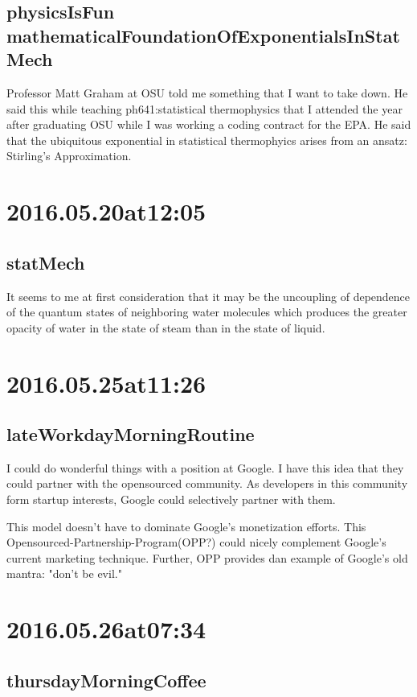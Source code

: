 \subsection*{physicsIsFun mathematicalFoundationOfExponentialsInStatMech}
Professor Matt Graham at OSU told me something that I want to take down. He said this while teaching ph641:statistical thermophysics that I attended the year after graduating OSU while I was working a coding contract for the EPA. He said that the ubiquitous exponential in statistical thermophyics arises from an ansatz: Stirling's Approximation.

\section*{ 2016.05.20at12:05 }
\subsection*{statMech}
It seems to me at first consideration that it may be the uncoupling of dependence of the quantum states of neighboring water molecules which produces the greater opacity of water in the state of steam than in the state of liquid.

\section*{ 2016.05.25at11:26 }
\subsection*{lateWorkdayMorningRoutine}
I could do wonderful things with a position at Google. I have this idea that they could partner with the opensourced community. As developers in this community form startup interests, Google could selectively partner with them.

This model doesn't have to dominate Google's monetization efforts. This Opensourced-Partnership-Program(OPP?) could nicely complement Google's current marketing technique. Further, OPP provides dan example of Google's old mantra: "don't be evil."

\section*{ 2016.05.26at07:34 }
\subsection*{thursdayMorningCoffee}


